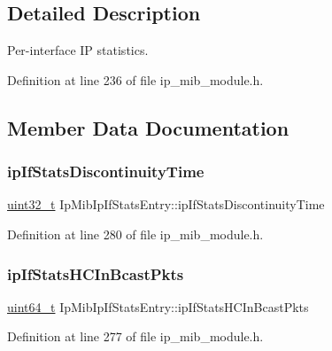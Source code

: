 \subsection{Detailed Description}
Per-\/interface IP statistics. 

Definition at line 236 of file ip\+\_\+mib\+\_\+module.\+h.



\subsection{Member Data Documentation}
\mbox{\label{structIpMibIpIfStatsEntry_aee3fa9969a8d264e733536e53449a7e7}} 
\subsubsection{\texorpdfstring{ip\+If\+Stats\+Discontinuity\+Time}{ipIfStatsDiscontinuityTime}}
{\footnotesize\ttfamily \hyperlink{stdint_8h_a435d1572bf3f880d55459d9805097f62}{uint32\+\_\+t} Ip\+Mib\+Ip\+If\+Stats\+Entry\+::ip\+If\+Stats\+Discontinuity\+Time}



Definition at line 280 of file ip\+\_\+mib\+\_\+module.\+h.

\mbox{\label{structIpMibIpIfStatsEntry_a5969a45d9047f51b2202e9af9f0cd53f}} 
\subsubsection{\texorpdfstring{ip\+If\+Stats\+H\+C\+In\+Bcast\+Pkts}{ipIfStatsHCInBcastPkts}}
{\footnotesize\ttfamily \hyperlink{stdint_8h_aec6fcb673ff035718c238c8c9d544c47}{uint64\+\_\+t} Ip\+Mib\+Ip\+If\+Stats\+Entry\+::ip\+If\+Stats\+H\+C\+In\+Bcast\+Pkts}



Definition at line 277 of file ip\+\_\+mib\+\_\+module.\+h.

